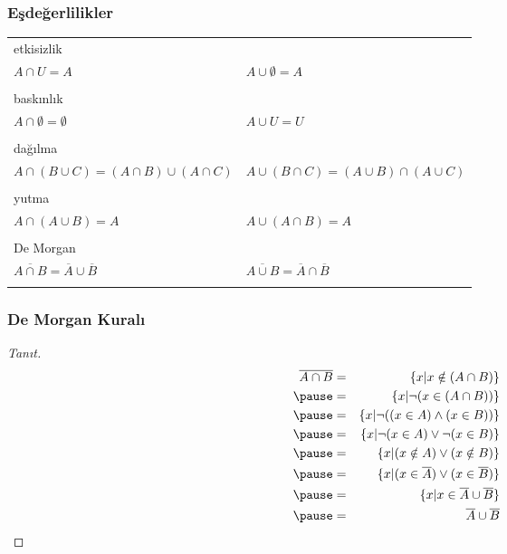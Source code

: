 \documentclass[dvipsnames]{beamer}
\theoremstyle{definition}
\theoremstyle{example}
\theoremstyle{plain}
\begin{document}
\begin{frame}
  \frametitle{Eşdeğerlilikler}

  \begin{tabular}{ll}
    \alert{etkisizlik} &\\
      $A \cap U = A$ &
      $A \cup \emptyset = A$\\\\
    \pause
    \alert{baskınlık} &\\
      $A \cap \emptyset = \emptyset$ &
      $A \cup U = U$\\\\
    \pause
    \alert{dağılma} &\\
      $A \cap (B \cup C) = (A \cap B) \cup (A \cap C)$ &
      $A \cup (B \cap C) = (A \cup B) \cap (A \cup C)$\\\\
    \pause
    \alert{yutma} &\\
      $A \cap (A \cup B) = A$ &
      $A \cup (A \cap B) = A$\\\\
    \pause
    \alert{De Morgan} &\\
      $\overline{A \cap B} = \overline{A} \cup \overline{B}$ &
      $\overline{A \cup B} = \overline{A} \cap \overline{B}$\\\\
  \end{tabular}
\end{frame}

\begin{frame}
  \frametitle{De Morgan Kuralı}

  \begin{proof}[Tanıt]
    \begin{eqnarray*}
      \overline{A \cap B} & = & \{x | x \notin (A \cap B)\}\\\pause
                          & = & \{x | \neg (x \in (A \cap B))\}\\\pause
                          & = & \{x | \neg ((x \in A) \wedge (x \in B))\}\\\pause
                          & = & \{x | \neg (x \in A) \vee \neg (x \in B)\}\\\pause
                          & = & \{x | (x \notin A) \vee (x \notin B)\}\\\pause
                          & = & \{x | (x \in \overline{A}) \vee (x \in \overline{B})\}\\\pause
                          & = & \{x | x \in \overline{A} \cup \overline{B}\}\\\pause
                          & = & \overline{A} \cup \overline{B}
    \end{eqnarray*}
  \end{proof}
\end{frame}
\end{document}
